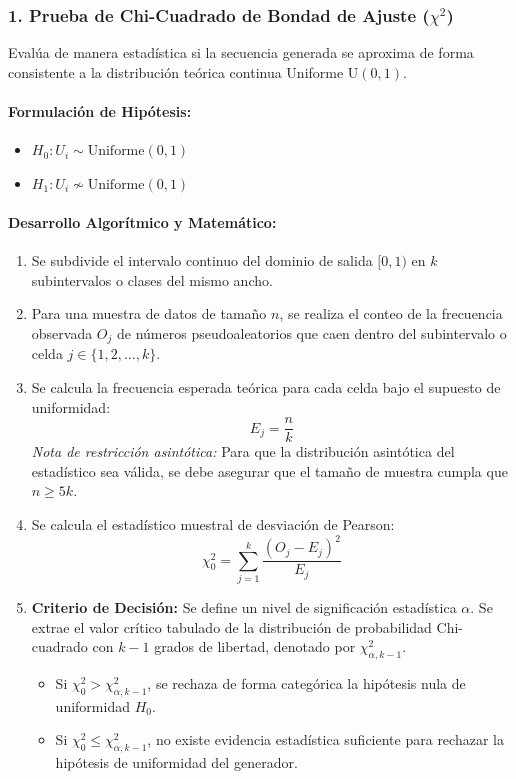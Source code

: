 \documentclass{article}
\begin{document}
\subsubsection{1. Prueba de Chi-Cuadrado de Bondad de Ajuste ($\chi^2$)}
Evalúa de manera estadística si la secuencia generada se aproxima de forma consistente a la distribución teórica continua Uniforme $\text{U}(0, 1)$.

\paragraph{Formulación de Hipótesis:}
\begin{itemize}
    \item $H_0: U_i \sim \text{Uniforme}(0, 1)$
    \item $H_1: U_i \not\sim \text{Uniforme}(0, 1)$
\end{itemize}

\paragraph{Desarrollo Algorítmico y Matemático:}
\begin{enumerate}
    \item Se subdivide el intervalo continuo del dominio de salida $[0, 1)$ en $k$ subintervalos o clases del mismo ancho.
    \item Para una muestra de datos de tamaño $n$, se realiza el conteo de la frecuencia observada $O_j$ de números pseudoaleatorios que caen dentro del subintervalo o celda $j \in \{1, 2, \dots, k\}$.
    \item Se calcula la frecuencia esperada teórica para cada celda bajo el supuesto de uniformidad:
    \begin{equation}
        E_j = \frac{n}{k}
    \end{equation}
    \emph{Nota de restricción asintótica:} Para que la distribución asintótica del estadístico sea válida, se debe asegurar que el tamaño de muestra cumpla que $n \ge 5k$.
    \item Se calcula el estadístico muestral de desviación de Pearson:
    \begin{equation}
        \chi_0^2 = \sum_{j=1}^k \frac{(O_j - E_j)^2}{E_j}
    \end{equation}
    \item \textbf{Criterio de Decisión:} Se define un nivel de significación estadística $\alpha$. Se extrae el valor crítico tabulado de la distribución de probabilidad Chi-cuadrado con $k-1$ grados de libertad, denotado por $\chi_{\alpha, k-1}^2$. 
    \begin{itemize}
        \item Si $\chi_0^2 > \chi_{\alpha, k-1}^2$, se rechaza de forma categórica la hipótesis nula de uniformidad $H_0$.
        \item Si $\chi_0^2 \le \chi_{\alpha, k-1}^2$, no existe evidencia estadística suficiente para rechazar la hipótesis de uniformidad del generador.
    \end{itemize}
\end{enumerate}
\end{document}
